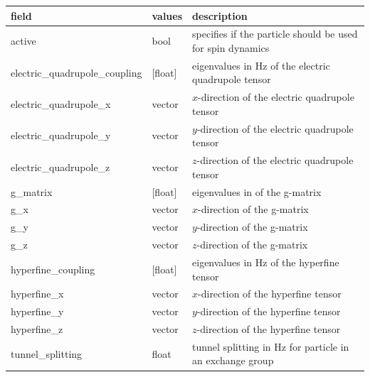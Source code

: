 \documentclass{book}
\begin{document}
\begin{center}
\begin{tabular}{| m{20em} | m{1.5cm}| m{7cm} |}
 \hline 
 \textbf{field} & \textbf{values} & \textbf{description} \\ 
 \hline 
 active & bool & 
 specifies if the particle should be used for spin dynamics\\
 \hline 
 electric\_quadrupole\_coupling & [float] & 
 eigenvalues in Hz of the electric quadrupole tensor\\
 \hline 
 electric\_quadrupole\_x & 
 vector & $x$-direction of the electric quadrupole tensor\\
 \hline 
 electric\_quadrupole\_y & 
 vector & $y$-direction of the electric quadrupole tensor\\
 \hline 
 electric\_quadrupole\_z & 
 vector & $z$-direction of the electric quadrupole tensor\\
 \hline 
 g\_matrix & [float] & eigenvalues in of the g-matrix\\
 \hline 
 g\_x & vector & $x$-direction of the g-matrix\\
 \hline 
 g\_y & vector & $y$-direction of the g-matrix\\
 \hline 
 g\_z & vector & $z$-direction of the g-matrix\\
 \hline 
 hyperfine\_coupling & [float] & eigenvalues in Hz of the hyperfine tensor\\
 \hline 
 hyperfine\_x & vector & $x$-direction of the hyperfine tensor\\
 \hline 
 hyperfine\_y & vector & $y$-direction of the hyperfine tensor\\
 \hline 
 hyperfine\_z & vector & $z$-direction of the hyperfine tensor\\
 \hline 
 tunnel\_splitting & float & 
 tunnel splitting in Hz for particle in an exchange group \\
 \hline 
\end{tabular}
\end{center} 
\end{document}
